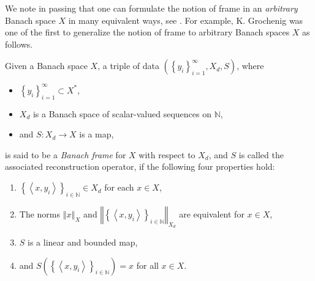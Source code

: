 \documentclass{amsart}%
\theoremstyle{plain}
\numberwithin{equation}{section}
\begin{document}
We note in passing that one can formulate the notion of frame in an
\emph{arbitrary} Banach space $X$ in many equivalent ways, see \cite{CaHaLa}.
For example, K. Grochenig \cite{Gro} was one of the first to generalize the
notion of frame to arbitrary Banach spaces $X$ as follows.

Given a Banach space $X$, a triple of data $\left(  \left\{  y_{i}\right\}
_{i=1}^{\infty},X_{d},S\right)  $, where

\begin{itemize}
\item $\left\{  y_{i}\right\}  _{i=1}^{\infty}\subset X^{\ast}$,

\item $X_{d}$ is a Banach space of scalar-valued sequences on $\mathbb{N}$,

\item and $S:X_{d}\rightarrow X$ is a map,
\end{itemize}

is said to be a \emph{Banach frame} for $X$ with respect to $X_{d}$, and $S$
is called the associated reconstruction operator, if the following four
properties hold:

\begin{enumerate}
\item $\left\{  \left\langle x,y_{i}\right\rangle \right\}  _{i\in\mathbb{N}%
}\in X_{d}$ for each $x\in X$,

\item The norms $\left\Vert x\right\Vert _{X}$ and $\left\Vert \left\{
\left\langle x,y_{i}\right\rangle \right\}  _{i\in\mathbb{N}}\right\Vert
_{X_{d}}$ are equivalent for $x\in X$,

\item $S$ is a linear and bounded map,

\item and $S\left(  \left\{  \left\langle x,y_{i}\right\rangle \right\}
_{i\in\mathbb{N}}\right)  =x$ for all $x\in X$.
\end{enumerate}
\end{document}
